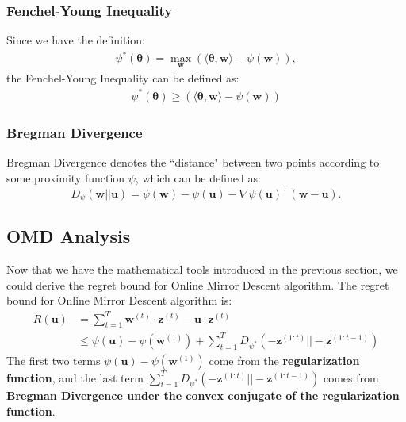 \documentclass[11pt]{article}
\DeclareMathOperator*{\maximize}{max}
\newcommand{\btheta}{\boldsymbol{\theta}}
\newcommand{\bw}{\boldsymbol{w}}
\newcommand{\bu}{\boldsymbol{u}}
\begin{document}
\subsubsection{Fenchel-Young Inequality}
Since we have the definition: 
\begin{align}
\psi^* (\btheta) = \maximize_{\bw} \left( \langle \btheta, \bw\rangle - \psi (\bw) \right), \nonumber
\end{align}
the Fenchel-Young Inequality can be defined as:
\begin{align}
\psi^* (\btheta) \geq \left( \langle \btheta, \bw\rangle - \psi (\bw) \right) \nonumber
\end{align}

\subsubsection{Bregman Divergence}

Bregman Divergence denotes the ``distance" between two points according to some proximity function $\psi$, which can be defined as:
$$D_{\psi} (\bw||\bu) = \psi(\bw) - \psi(\bu) - \nabla \psi(\bu)^{\top} (\bw-\bu).$$


\subsection{OMD Analysis}

Now that we have the mathematical tools introduced in the previous section, we could derive the regret bound for Online Mirror Descent algorithm. The regret bound for Online Mirror Descent algorithm is:
%
\begin{equation*}
\begin{split}
R(\boldsymbol{u}) &= \sum_{t=1}^{T} \boldsymbol{w}^{(t)} \cdot \boldsymbol{z}^{(t)} - \boldsymbol{u} \cdot \boldsymbol{z}^{(t)} \\
& \leq \psi(\boldsymbol{u}) - \psi(\boldsymbol{w}^{(1)}) + \sum_{t=1}^{T} D_{\psi^*} (-\boldsymbol{z}^{(1:t)} || -\boldsymbol{z}^{(1:t-1)})
\end{split}
\end{equation*}
%
The first two terms $\psi(\boldsymbol{u}) - \psi(\boldsymbol{w}^{(1)})$ come from the \textbf{regularization function}, and the last term $\sum_{t=1}^{T} D_{\psi^*} (-\boldsymbol{z}^{(1:t)} || -\boldsymbol{z}^{(1:t-1)})$ comes from \textbf{Bregman Divergence under the convex conjugate of the regularization function}.
\end{document}
